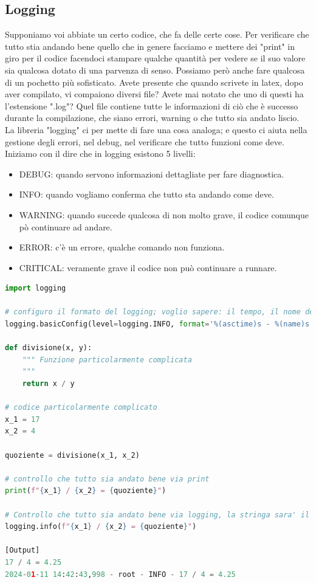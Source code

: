 \documentclass[10pt,a4paper]{article}
\begin{document}
\subsection{Logging}
Supponiamo voi abbiate un certo codice, che fa delle certe cose. Per verificare che tutto stia andando bene quello che in genere facciamo e mettere dei "print" in giro per il codice facendoci stampare qualche quantità per vedere se il suo valore sia qualcosa dotato di una parvenza di senso. Possiamo però anche fare qualcosa di un pochetto più sofisticato. Avete presente che quando scrivete in latex, dopo aver compilato, vi compaiono diversi file? Avete mai notato che uno di questi ha l'estensione ".log"? Quel file contiene tutte le informazioni di ciò che è successo durante la compilazione, che siano errori, warning o che tutto sia andato liscio. La libreria "logging" ci per mette di fare una cosa analoga; e questo ci aiuta nella gestione degli errori, nel debug, nel verificare che tutto funzioni come deve. Iniziamo con il dire che in logging esistono 5 livelli: \\
\begin{itemize}
\item DEBUG: quando servono informazioni dettagliate per fare diagnostica.
\item INFO: quando vogliamo conferma che tutto sta andando come deve.
\item WARNING: quando succede qualcosa di non molto grave, il codice comunque pò continuare ad andare.
\item ERROR: c'è un errore, qualche comando non funziona.
\item CRITICAL: veramente grave il codice non può continuare a runnare.
\end{itemize} 
\begin{lstlisting}[language=Python]
import logging

# configuro il formato del logging; voglio sapere: il tempo, il nome del logger, il livello, e il messaggio
logging.basicConfig(level=logging.INFO, format='%(asctime)s - %(name)s - %(levelname)s - %(message)s')

def divisione(x, y):
    """ Funzione particolarmente complicata
    """
    return x / y

# codice particolarmente complicato
x_1 = 17
x_2 = 4

quoziente = divisione(x_1, x_2)

# controllo che tutto sia andato bene via print
print(f"{x_1} / {x_2} = {quoziente}")

# Controllo che tutto sia andato bene via logging, la stringa sara' il messaggio
logging.info(f"{x_1} / {x_2} = {quoziente}")

[Output]
17 / 4 = 4.25
2024-01-11 14:42:43,998 - root - INFO - 17 / 4 = 4.25
\end{lstlisting}
\end{document}
